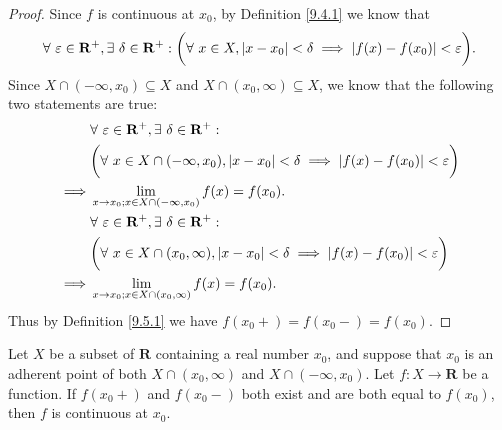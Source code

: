 \begin{proof}
    Since \(f\) is continuous at \(x_0\), by Definition \ref{9.4.1} we know that
    \[
        \forall\ \varepsilon \in \mathbf{R}^+, \exists\ \delta \in \mathbf{R}^+ : \bigg(\forall\ x \in X, \abs*{x - x_0} < \delta \implies \abs*{f(x) - f(x_0)} < \varepsilon\bigg).
    \]
    Since \(X \cap (-\infty, x_0) \subseteq X\) and \(X \cap (x_0, \infty) \subseteq X\), we know that the following two statements are true:
    \begin{align*}
        &\forall\ \varepsilon \in \mathbf{R}^+, \exists\ \delta \in \mathbf{R}^+ : \\
        &\bigg(\forall\ x \in X \cap (-\infty, x_0), \abs*{x - x_0} < \delta \implies \abs*{f(x) - f(x_0)} < \varepsilon\bigg) \\
        \implies & \lim_{x \to x_0 ; x \in X \cap (-\infty, x_0)} f(x) = f(x_0). \\
        &\forall\ \varepsilon \in \mathbf{R}^+, \exists\ \delta \in \mathbf{R}^+ : \\
        &\bigg(\forall\ x \in X \cap (x_0, \infty), \abs*{x - x_0} < \delta \implies \abs*{f(x) - f(x_0)} < \varepsilon\bigg) \\
        \implies & \lim_{x \to x_0 ; x \in X \cap (x_0, \infty)} f(x) = f(x_0).
    \end{align*}
    Thus by Definition \ref{9.5.1} we have \(f(x_0+) = f(x_0-) = f(x_0)\).
\end{proof}

\setcounter{theorem}{2}
\begin{proposition}\label{9.5.3}
    Let \(X\) be a subset of \(\mathbf{R}\) containing a real number \(x_0\), and suppose that \(x_0\) is an adherent point of both \(X \cap (x_0, \infty)\) and \(X \cap (-\infty, x_0)\).
    Let \(f : X \to \mathbf{R}\) be a function.
    If \(f(x_0+)\) and \(f(x_0-)\) both exist and are both equal to \(f(x_0)\), then \(f\) is continuous at \(x_0\).
\end{proposition}

